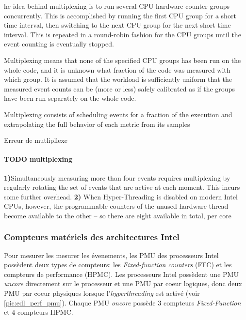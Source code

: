    he idea behind multiplexing is to run several CPU hardware counter groups concurrently. This is accomplished by running the first CPU group for a short time interval, then switching to the next CPU group for the next short time interval. This is repeated in a round-robin fashion for the CPU groups until the event counting is eventually stopped.
   
   Multiplexing means that none of the specified CPU groups has been run on the whole code, and it is unknown what fraction of the code was measured with which group. It is assumed that the workload is sufficiently uniform that the measured event counts can be (more or less) safely calibrated as if the groups have been run separately on the whole code.
   
   Multiplexing consists
of scheduling events for a fraction of the execution and
extrapolating the full behavior of each metric from its
samples

Erreur de mutlipllexe \cite{Lim}
    
        
    \paragraph{TODO multiplexing} \textbf{1)}Simultaneously measuring more than four events requires multiplexing by regularly rotating the set of events that are active at each moment. This incurs some further overhead.
    \textbf{2)} When Hyper-Threading is disabled on modern Intel CPUs, however, the programmable counters of the unused hardware thread become available to the other – so there are eight available in total, per core



    \subsubsection{Compteurs matériels des architectures Intel}
        

        Pour mesurer les mesurer les évenements, les PMU des processeurs Intel possèdent deux types de compteurs: les \textit{Fixed-function counters} (FFC) et les compteurs de performance (HPMC). Les processeurs Intel possèdent une PMU \textit{uncore} directement sur le processeur et une PMU par coeur logiques, donc deux PMU par coeur physiques lorsque l'\textit{hyperthreading} est activé (voir \autoref{pic:edl_perf_pmu}). Chaque PMU \textit{oncore} possède 3 compteurs \textit{Fixed-Function} et 4 compteurs HPMC.
        
